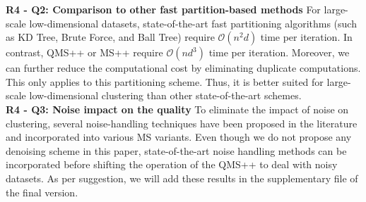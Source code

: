 \documentclass{article}
\begin{document}
\textbf{R4 - Q2: Comparison to other fast partition-based methods} For large-scale low-dimensional datasets, state-of-the-art fast partitioning algorithms (such as KD Tree, Brute Force, and Ball Tree) require $\mathcal{O}(n^2d)$ time per iteration. In contrast, QMS++ or MS++ require $\mathcal{O}(nd^3)$ time per iteration. Moreover, we can further reduce the computational cost by eliminating duplicate computations. This only applies to this partitioning scheme. Thus, it is better suited for large-scale low-dimensional clustering than other state-of-the-art schemes.\\
\textbf{R4 - Q3: Noise impact on the quality} To eliminate the impact of noise on clustering, several noise-handling techniques have been proposed in the literature and incorporated into various MS variants. Even though we do not propose any denoising scheme in this paper, state-of-the-art noise handling methods can be incorporated before shifting the operation of the QMS++ to deal with noisy datasets. As per suggestion, we will add these results in the supplementary file of the final version.
\end{document}
